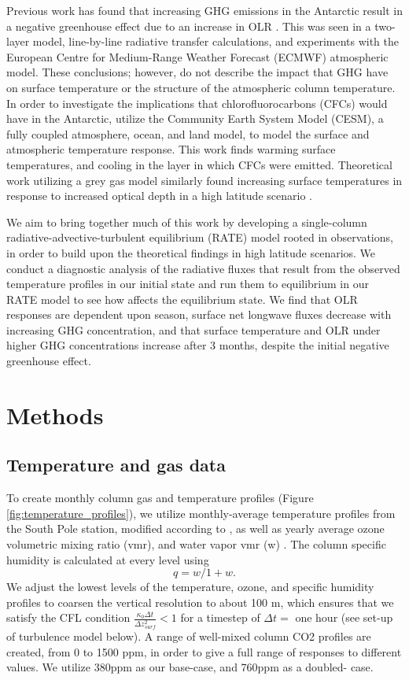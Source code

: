 \documentclass[12]{article}
\begin{document}
Previous work has found that increasing GHG emissions in the Antarctic result in a negative greenhouse effect due to an increase in OLR \citep{schmithusen_how_2015}. This was seen in a two-layer model, line-by-line radiative transfer calculations, and experiments with the European Centre for Medium-Range Weather Forecast (ECMWF) atmospheric model. These conclusions; however, do not describe the impact that GHG have on surface temperature or the structure of the atmospheric column temperature. In order to investigate the implications that chlorofluorocarbons (CFCs) would have in the Antarctic, \cite{flanner_climate_2018} utilize the Community Earth System Model (CESM), a fully coupled atmosphere, ocean, and land model, to model the surface and atmospheric temperature response. This work finds warming surface temperatures, and cooling in the layer in which CFCs were emitted. Theoretical work utilizing a grey gas model similarly found increasing surface temperatures in response to increased optical depth in a high latitude scenario \citep{payne_conceptual_2015}.

We aim to bring together much of this work by developing a single-column radiative-advective-turbulent equilibrium (RATE) model rooted in observations, in order to build upon the theoretical findings in high latitude scenarios. We conduct a diagnostic analysis of the radiative fluxes that result from the observed temperature profiles in our initial state and run them to equilibrium in our RATE model to see how  affects the equilibrium state. We find that OLR responses are dependent upon season, surface net longwave fluxes decrease with increasing GHG concentration, and that surface temperature and OLR under higher GHG concentrations increase after 3 months, despite the initial negative greenhouse effect.


\section{Methods}
\subsection{Temperature and gas data}
 To create monthly column gas and temperature profiles (Figure \ref{fig:temperature_profiles}), we utilize monthly-average temperature profiles from the South Pole station, modified according to \cite{schmithusen_how_2015}, as well as yearly average ozone volumetric mixing ratio (vmr), and water vapor vmr (w) \citep{schmithusen_how_2015}. The column specific humidity is calculated at every level using
\begin{equation}
    q = w/1+w.
\end{equation}
 We adjust the lowest levels of the temperature, ozone, and specific humidity profiles to coarsen the vertical resolution to about 100 m, which ensures that we satisfy the CFL condition $\frac{\kappa_0 \Delta t}{\Delta z^2_{surf}} < 1$ for a timestep of $\Delta t =$ one hour (see set-up of turbulence model below). A range of well-mixed column CO2 profiles are created, from 0 to 1500 ppm, in order to give a full range of responses to different values. We utilize 380ppm as our base-case, and 760ppm as a doubled- case.
\end{document}
